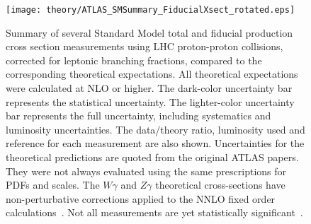 \begin{figure}
 \centering
 \texttt{[image: theory/ATLAS\_SMSummary\_FiducialXsect\_rotated.eps]}
 \caption[Summary of several Standard Model total and fiducial production cross section measurements using LHC proton-proton collisions, corrected for leptonic branching fractions, compared to the corresponding theoretical expectations.]{%
  Summary of several Standard Model total and fiducial production cross section measurements using LHC proton-proton collisions, corrected for leptonic branching fractions, compared to the corresponding theoretical expectations.
  All theoretical expectations were calculated at NLO or higher.
  The dark-color uncertainty bar represents the statistical uncertainty.
  The lighter-color uncertainty bar represents the full uncertainty, including systematics and luminosity uncertainties.
  The data/theory ratio, luminosity used and reference for each measurement are also shown.
  Uncertainties for the theoretical predictions are quoted from the original ATLAS papers.
  They were not always evaluated using the same prescriptions for PDFs and scales.
  The $W\gamma$ and $Z\gamma$ theoretical cross-sections have non-perturbative corrections applied to the NNLO fixed order calculations~\cite{STDM-2011-17}.
  Not all measurements are yet statistically significant~\cite{web:ATLAS_SM_summary_plots}.}
 \label{fig:cross_section_experiment_theory}
\end{figure}

